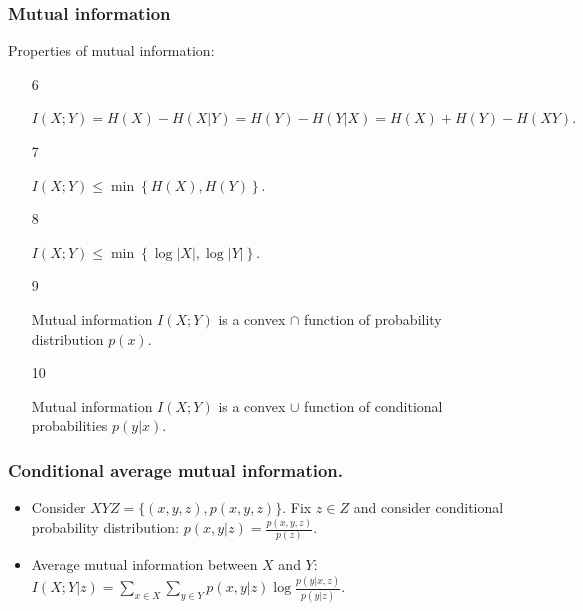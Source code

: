 \documentclass[14pt]{beamer}
\begin{document}
\begin{frame}
\frametitle{Mutual information}
Properties of mutual information:

\begin{enumerate}
    
    \item[6] 
    \begin{prop} \label{p5_6}
    $I(X;Y) = H(X) - H(X\vert Y) = H(Y) - H(Y\vert X) =H(X) + H(Y) - H(XY).$
    \end{prop}
    
    
    \pause \item[7] 
    \begin{prop} \label{p5_7}
    $I(X;Y) \le \min \left\{ {H(X),H(Y)} \right\}.$
    \end{prop}
    
    \pause \item[8] 
    \begin{prop} \label{p5_8}
    $I(X;Y) \le \min \left\{ {\log \vert X\vert ,\log \vert Y\vert } \right\}.$
    \end{prop}
    
    \pause \item[9] 
    \begin{prop}  \label{p5_9}
    Mutual information $I(X;Y)$ is a convex $ \cap $ function of probability distribution $p(x)$.
    \end{prop}
    
    \pause \item[10] 
    \begin{prop}  \label{p5_10}
    Mutual information $I(X;Y)$ is a convex $ \cup $ function of conditional probabilities $p(y\vert x)$.
    \end{prop}    
    

\end{enumerate}
\end{frame}


\begin{frame}
\frametitle{Conditional average mutual information.}
\begin{itemize}
    \item 
    Consider $XYZ = \{(x,y,z),p(x,y,z)\}.$ 
    Fix $z \in Z$ and consider conditional probability distribution:
    $p(x,y\vert z) = \frac{p(x,y,z)}{p(z)}.$

    \item   
    Average mutual information between $X$ and $Y$:
    $ I(X;Y\vert z) = \sum\limits_{x \in X} {\sum\limits_{y \in Y} {p(x,y\vert z)\log \frac{p(y\vert x,z)}{p(y\vert z)}} }.$

\end{itemize}
\end{frame}
\end{document}
